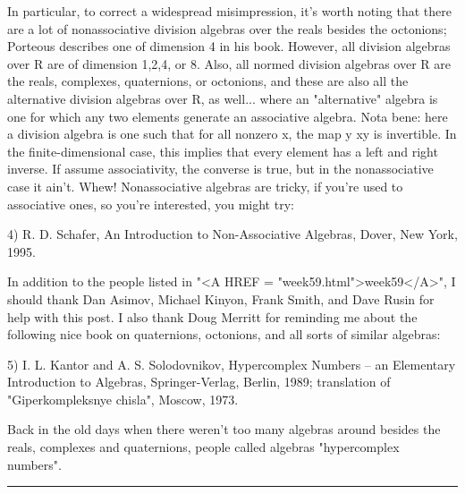 In particular, to correct a widespread misimpression, it's worth noting
that there are a lot of nonassociative division algebras over the reals
besides the octonions; Porteous describes one of dimension 4 in his
book.  However, all division algebras over R are of dimension 1,2,4, or
8.  Also, all normed division algebras over R are the reals, complexes,
quaternions, or octonions, and these are also all the alternative
division algebras over R, as well... where an "alternative" algebra is
one for which any two elements generate an associative algebra.  Nota
bene: here a division algebra is one such that for all nonzero x, the
map y \to  xy is invertible.  In the finite-dimensional case, this implies
that every element has a left and right inverse.  If assume
associativity, the converse is true, but in the nonassociative case it
ain't.  Whew!  Nonassociative algebras are tricky, if you're used to
associative ones, so you're interested, you might try:

4) R. D. Schafer, An Introduction to Non-Associative Algebras,
Dover, New York, 1995.

In addition to the people listed in "<A HREF = "week59.html">week59</A>", I should thank Dan
Asimov, Michael Kinyon, Frank Smith, and Dave Rusin for help with this post.
I also thank Doug Merritt for reminding me about the following nice
book on quaternions, octonions, and all sorts of similar algebras:

5) I. L. Kantor and A. S. Solodovnikov, Hypercomplex Numbers -- an
Elementary Introduction to Algebras, Springer-Verlag, Berlin, 1989; translation of "Giperkompleksnye chisla", Moscow, 1973.
  
Back in the old days when there weren't too many algebras around 
besides the reals, complexes and quaternions, people called algebras
"hypercomplex numbers".
\par\noindent\rule{\textwidth}{0.4pt}

